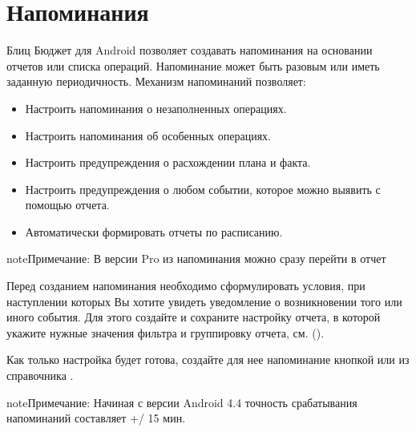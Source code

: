\documentclass[a4paper,10pt,russian]{sphinxmanual}
\begin{document}
\chapter{Напоминания}
\label{\detokenize{reminders:chapter-reminders}}\label{\detokenize{reminders:id1}}\label{\detokenize{reminders::doc}}
\sphinxAtStartPar
Блиц Бюджет для Android позволяет создавать напоминания на основании отчетов или списка операций. Напоминание может быть разовым
или иметь заданную периодичность. Механизм напоминаний позволяет:
\begin{itemize}
\item {} 
\sphinxAtStartPar
Настроить напоминания о незаполненных операциях.

\item {} 
\sphinxAtStartPar
Настроить напоминания об особенных операциях.

\item {} 
\sphinxAtStartPar
Настроить предупреждения о расхождении плана и факта.

\item {} 
\sphinxAtStartPar
Настроить предупреждения о любом событии, которое можно выявить с помощью отчета.

\item {} 
\sphinxAtStartPar
Автоматически формировать отчеты по расписанию.

\end{itemize}

\begin{sphinxadmonition}{note}{Примечание:}
\sphinxAtStartPar
В версии Pro из напоминания можно сразу перейти в отчет
\end{sphinxadmonition}

\sphinxAtStartPar
Перед созданием напоминания необходимо сформулировать условия, при наступлении которых Вы хотите увидеть
уведомление о возникновении того или иного события. Для этого создайте и сохраните настройку
отчета, в которой укажите нужные значения фильтра и группировку отчета, см.
{\hyperref[\detokenize{shortcuts:chapter-shortcuts}]{}} ().

\sphinxAtStartPar
Как только настройка будет готова, создайте для нее напоминание кнопкой  или из справочника .

\begin{sphinxadmonition}{note}{Примечание:}
\sphinxAtStartPar
Начиная с версии Android 4.4 точность срабатывания напоминаний составляет +/\sphinxhyphen{} 15 мин.
\end{sphinxadmonition}
\end{document}
